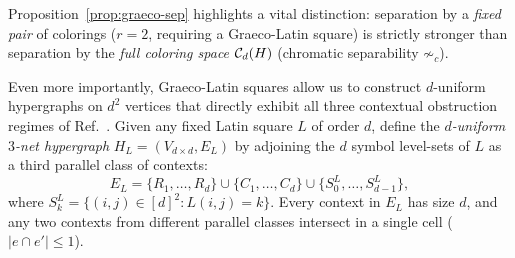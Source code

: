 \documentclass[aps,pra,reprint,superscriptaddress,longbibliography,nofootinbib,floatfix,10pt]{revtex4-2}
\theoremstyle{definition}\newtheorem{definition}[theorem]{Definition}
\theoremstyle{remark}\newtheorem{remark}[theorem]{Remark}
\begin{document}
Proposition~\ref{prop:graeco-sep} highlights a vital distinction: separation by a \emph{fixed pair} of colorings ($r=2$, requiring a Graeco-Latin square) is strictly stronger than separation by the \emph{full coloring space} $\mathcal C_d(H)$ (chromatic separability $\not\sim_c$).

Even more importantly, Graeco-Latin squares allow us to construct $d$-uniform hypergraphs on $d^2$ vertices that directly exhibit all three contextual obstruction regimes of Ref.~\cite{svozil2026contexts}. Given any fixed Latin square $L$ of order $d$, define the \emph{$d$-uniform $3$-net hypergraph} $H_L=(V_{d\times d},E_L)$ by adjoining the $d$ symbol level-sets of $L$ as a third parallel class of contexts:
\begin{equation}\label{eq:3net}
E_L=\{R_1,\ldots,R_d\}\cup\{C_1,\ldots,C_d\}\cup\{S_0^L,\ldots,S_{d-1}^L\},
\end{equation}
where $S_k^L=\{(i,j)\in[d]^2:L(i,j)=k\}$. Every context in $E_L$ has size $d$, and any two contexts from different parallel classes intersect in a single cell ($|e\cap e'|\le 1$).
\end{document}
